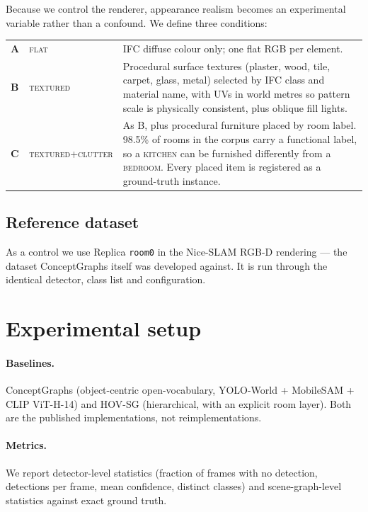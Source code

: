 \documentclass[11pt,a4paper]{article}
\begin{document}
Because we control the renderer, appearance realism becomes an experimental
variable rather than a confound. We define three conditions:

\begin{center}
\small
\begin{tabular}{@{}llp{8.2cm}@{}}
\toprule
\textbf{A} & \textsc{flat} & IFC diffuse colour only; one flat RGB per element. \\
\textbf{B} & \textsc{textured} & Procedural surface textures (plaster, wood,
tile, carpet, glass, metal) selected by IFC class and material name, with UVs in
world metres so pattern scale is physically consistent, plus oblique fill
lights. \\
\textbf{C} & \textsc{textured+clutter} & As B, plus procedural furniture placed
by room label. 98.5\% of rooms in the corpus carry a functional label, so a
\textsc{kitchen} can be furnished differently from a \textsc{bedroom}. Every
placed item is registered as a ground-truth instance. \\
\bottomrule
\end{tabular}
\end{center}

\subsection{Reference dataset}

As a control we use Replica \texttt{room0} in the Nice-SLAM RGB-D rendering ---
the dataset ConceptGraphs itself was developed against. It is run through the
identical detector, class list and configuration.

\section{Experimental setup}

\paragraph{Baselines.} ConceptGraphs (object-centric open-vocabulary,
YOLO-World + MobileSAM + CLIP ViT-H-14) and HOV-SG (hierarchical, with an
explicit room layer). Both are the published implementations, not
reimplementations.

\paragraph{Metrics.} We report detector-level statistics (fraction of frames
with no detection, detections per frame, mean confidence, distinct classes) and
scene-graph-level statistics against exact ground truth.
\end{document}

